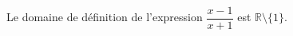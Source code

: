 Le domaine de définition de l'expression $\dfrac{x-1}{x+1}$ est $\mathbb R \setminus \{1\}$.

\begin{reponses}
\end{reponses}

